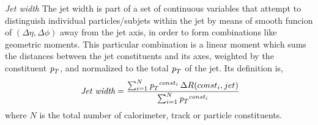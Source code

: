 


{ \em Jet width} The jet width is part of a set of continuous variables that attempt to distinguish individual particles/subjets within the jet by means of smooth funcion of $(\Delta \eta, \Delta \phi)$ away from the jet axis, in order to form combinations like geometric moments.  This particular combination is a linear moment which sums the distances between the jet constituents and its axes, weighted by the constituent ${\emph{p}_{T}}$, and normalized to the total ${\emph{p}_{T}}$ of the jet.  Its definition is,
%
\begin{equation} 
\mbox{ {\it Jet width}} = \frac{\sum_{i=1}^N {\emph{p}_{T}}^{const_i} \,\Delta R (const_i,jet) }{\sum_{i=1}^N {\emph{p}_{T}}^{const_i} }
\label{eqn:trackjetwidth}
\end{equation} 
%
where $N$ is the total number of calorimeter, track or particle constituents.  %

